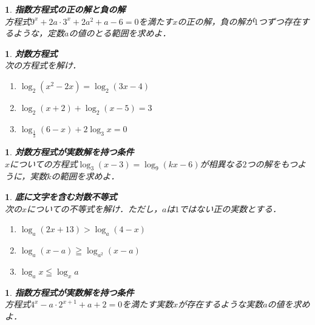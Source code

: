\documentclass[10pt,
fleqn,
dvipdfmx,
uplatex
]{jsarticle}
\newtheorem{question}[Question]{}
\begin{document}
\begin{question}{\bf\boldmath 指数方程式の正の解と負の解}\\
方程式$9^x+2a\cdot 3^x+2a^2+a-6=0$を満たす$x$の正の解，負の解が$1$つずつ存在するような，定数$a$の値のとる範囲を求めよ．
\end{question}



\begin{question}{\bf\boldmath 対数方程式}\\
次の方程式を解け．
\begin{enumerate}
\item $\log _2\left(x^2-2x\right)=\log _2\left(3x-4\right)$
\item $\log _2\left(x+2\right)+\log _2\left(x-5\right)=3$
\item $\log _{\frac{1}{3}}\left(6-x\right)+2\log _3x=0$
\end{enumerate}

\end{question}



\begin{question}{\bf\boldmath 対数方程式が実数解を持つ条件}\\
$x$についての方程式$\log _3\left(x-3\right)=\log _9\left(kx-6\right)$が相異なる$2$つの解をもつように，実数$k$の範囲を求めよ．
\end{question}



\begin{question}{\bf\boldmath 底に文字を含む対数不等式}\\
次の$x$についての不等式を解け．ただし，$a$は$1$ではない正の実数とする．
\begin{enumerate}
\item $\log _a\left(2x+{13}\right)>\log _a\left(4-x\right)$
\item $\log _a\left(x-a\right)\geqq \log _{a^2}\left(x-a\right)$
\item $\log _ax\leqq \log _xa$
\end{enumerate}

\end{question}



\begin{question}{\bf\boldmath 指数方程式が実数解を持つ条件}\\
方程式$4^x-a\cdot 2^{x+1}+a+2=0$を満たす実数$x$が存在するような実数$a$の値を求めよ．
\end{question}
\end{document}
